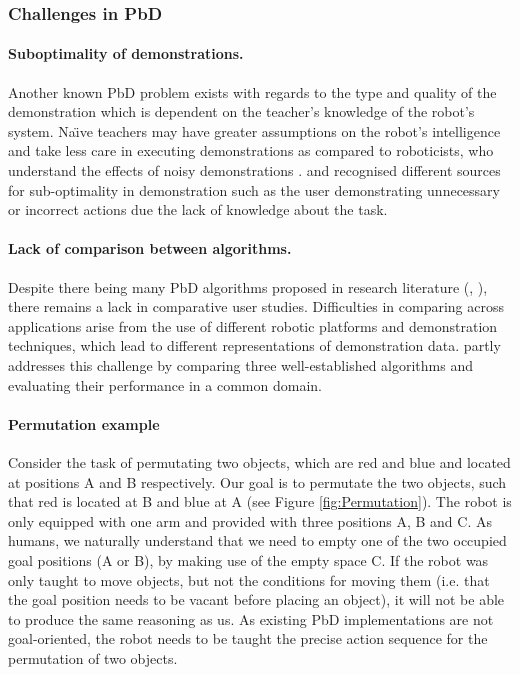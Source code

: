 \subsubsection{Challenges in PbD}\label{sssec:Challenges in PbD}

\paragraph{Suboptimality of demonstrations.}
Another known PbD problem exists with regards to the type and quality of the demonstration which is dependent on the teacher's knowledge of the robot's system.
Na\"{\i}ve teachers may have greater assumptions on the robot's intelligence and take less care in executing demonstrations as compared to roboticists, who understand the effects of noisy demonstrations \cite{suay2012practical}.
\cite{chen2003programing} and \cite{kaiser1995obtaining} recognised different sources for sub-optimality in demonstration such as the user demonstrating unnecessary or incorrect actions due the lack of knowledge about the task.

\paragraph{Lack of comparison between algorithms.}
Despite there being many PbD algorithms proposed in research literature (\cite{argall2009survey}, \cite{billing2010formalism}), there remains a lack in comparative user studies.
Difficulties in comparing across applications arise from the use of different robotic platforms and demonstration techniques, which lead to different representations of demonstration data.
\cite{suay2012practical} partly addresses this challenge by comparing three well-established algorithms and evaluating their performance in a common domain.


\paragraph{Permutation example}
Consider the task of permutating two objects, which are red and blue and located at positions A and B respectively.
Our goal is to permutate the two objects, such that red is located at B and blue at A (see Figure \ref{fig:Permutation}).
The robot is only equipped with one arm and provided with three positions A, B and C.
As humans, we naturally understand that we need to empty one of the two occupied goal positions (A or B), by making use of the empty space C.
If the robot was only taught to move objects, but not the conditions for moving them (i.e. that the goal position needs to be vacant before placing an object), it will not be able to produce the same reasoning as us.
As existing PbD implementations are not goal-oriented, the robot needs to be taught the precise action sequence for the permutation of two objects.

